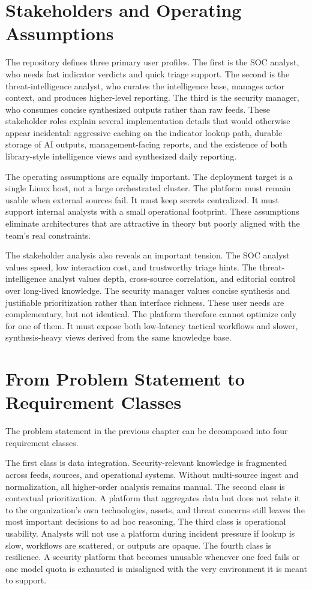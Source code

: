 \section{Stakeholders and Operating Assumptions}
The repository defines three primary user profiles. The first is the SOC analyst, who needs fast indicator verdicts and quick triage support. The second is the threat-intelligence analyst, who curates the intelligence base, manages actor context, and produces higher-level reporting. The third is the security manager, who consumes concise synthesized outputs rather than raw feeds. These stakeholder roles explain several implementation details that would otherwise appear incidental: aggressive caching on the indicator lookup path, durable storage of AI outputs, management-facing reports, and the existence of both library-style intelligence views and synthesized daily reporting.

The operating assumptions are equally important. The deployment target is a single Linux host, not a large orchestrated cluster. The platform must remain usable when external sources fail. It must keep secrets centralized. It must support internal analysts with a small operational footprint. These assumptions eliminate architectures that are attractive in theory but poorly aligned with the team's real constraints.

The stakeholder analysis also reveals an important tension. The SOC analyst values speed, low interaction cost, and trustworthy triage hints. The threat-intelligence analyst values depth, cross-source correlation, and editorial control over long-lived knowledge. The security manager values concise synthesis and justifiable prioritization rather than interface richness. These user needs are complementary, but not identical. The platform therefore cannot optimize only for one of them. It must expose both low-latency tactical workflows and slower, synthesis-heavy views derived from the same knowledge base.

\section{From Problem Statement to Requirement Classes}
The problem statement in the previous chapter can be decomposed into four requirement classes.

The first class is data integration. Security-relevant knowledge is fragmented across feeds, sources, and operational systems. Without multi-source ingest and normalization, all higher-order analysis remains manual. The second class is contextual prioritization. A platform that aggregates data but does not relate it to the organization's own technologies, assets, and threat concerns still leaves the most important decisions to ad hoc reasoning. The third class is operational usability. Analysts will not use a platform during incident pressure if lookup is slow, workflows are scattered, or outputs are opaque. The fourth class is resilience. A security platform that becomes unusable whenever one feed fails or one model quota is exhausted is misaligned with the very environment it is meant to support.

